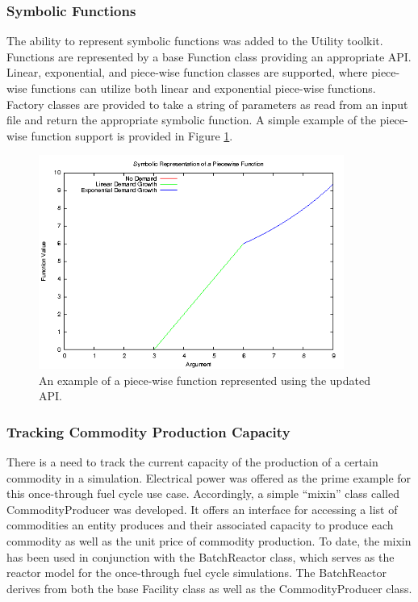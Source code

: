 \subsubsection{Symbolic Functions}

The ability to represent symbolic functions was added to the \Cyclus Utility
toolkit. Functions are represented by a base Function class providing an
appropriate API. Linear, exponential, and piece-wise function classes are
supported, where piece-wise functions can utilize both linear and exponential
piece-wise functions. Factory classes are provided to take a string of parameters
as read from an input file and return the appropriate symbolic function. A
simple example of the piece-wise function support is provided in Figure
\ref{fig:piecewise}.

\begin{figure}[H]
  \begin{center}
    \includegraphics[height=7cm]{./chapters/prevwork/piecewise.png}
  \caption{An example of a piece-wise function represented using the updated API.}
  \label{fig:piecewise}
  \end{center}
\end{figure}

\subsubsection{Tracking Commodity Production Capacity}

There is a need to track the current capacity of the production of a certain
commodity in a simulation. Electrical power was offered as the prime example for
this once-through fuel cycle use case. Accordingly, a simple ``mixin'' class
\cite{ulrich_mixin-based_2001} called CommodityProducer was developed. It offers
an interface for accessing a list of commodities an entity produces and their
associated capacity to produce each commodity as well as the unit price of
commodity production. To date, the mixin has been used in conjunction with the
BatchReactor class, which serves as the reactor model for the once-through fuel
cycle simulations. The BatchReactor derives from both the base Facility class
as well as the CommodityProducer class.

